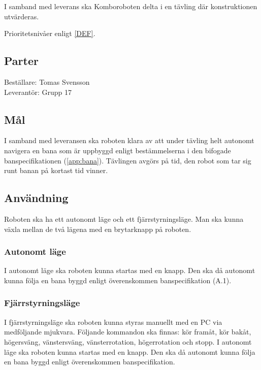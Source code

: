 \documentclass[a4paper,12pt]{article}
\begin{document}
I samband med leverans ska Komboroboten delta i en tävling där konstruktionen utvärderas.

Prioritetsnivåer enligt \ref{DEF}.



\begin{LIPSkravlista}
\end{LIPSkravlista}

\subsection{Parter}
Beställare: Tomas Svensson \\
Leverantör: Grupp 17

\subsection{Mål}
I samband med leveransen ska roboten klara av att under tävling helt autonomt navigera
en bana som är uppbyggd enligt bestämmelserna i den bifogade banspecifikationen (\ref{app:bana}). 
 Tävlingen avgörs på tid, den robot som tar sig runt banan på kortast tid vinner.

\subsection{Användning}
Roboten ska ha ett autonomt läge och ett fjärrstyrningsläge.
Man ska kunna växla mellan de två lägena med en brytarknapp på roboten.

\subsubsection{Autonomt läge}
I autonomt läge ska roboten kunna startas med en knapp. Den ska då autonomt kunna följa en bana byggd enligt överenskommen banspecifikation (A.1).

\subsubsection{Fjärrstyrningsläge}
I fjärrstyrningsläge ska roboten kunna styras manuellt med en PC via medföljande mjukvara.
Följande kommandon ska finnas: kör framåt, kör bakåt, högersväng, vänstersväng, vänsterrotation, högerrotation och stopp. 
I autonomt läge ska roboten kunna startas med en knapp. Den ska då autonomt kunna följa en bana byggd enligt överenskommen banspecifikation. 
\end{document}
